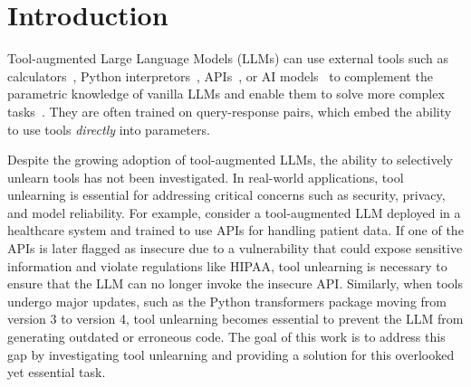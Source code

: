 \section{Introduction}

Tool-augmented Large Language Models (LLMs) can use external tools such as calculators~\citep{schick2023toolformer}, 
Python interpretors~\citep{pal}, 
APIs~\citep{tang2023toolalpaca}, or 
AI models~\citep{patil2023gorilla} to complement the parametric knowledge of vanilla LLMs and enable them to solve more complex tasks~\citep{schick2023toolformer,patil2023gorilla}. They are often trained on query-response pairs, which embed the ability to use tools {\em directly} into parameters.


Despite the growing adoption of tool-augmented LLMs, the ability to selectively unlearn tools has not been investigated. In real-world applications, tool unlearning is essential for addressing critical concerns such as security, privacy, and model reliability. 
For example, consider a tool-augmented LLM deployed in a healthcare system and trained to use APIs for handling patient data. If one of the APIs is later flagged as insecure due to a vulnerability that could expose sensitive information and violate regulations like HIPAA, tool unlearning is necessary to ensure that the LLM can no longer invoke the insecure API. Similarly, when tools undergo major updates, such as the Python transformers package moving from version 3 to version 4, tool unlearning becomes essential to prevent the LLM from generating outdated or erroneous code.
The goal of this work is to address this gap by investigating tool unlearning and providing a solution for this overlooked yet essential task.



